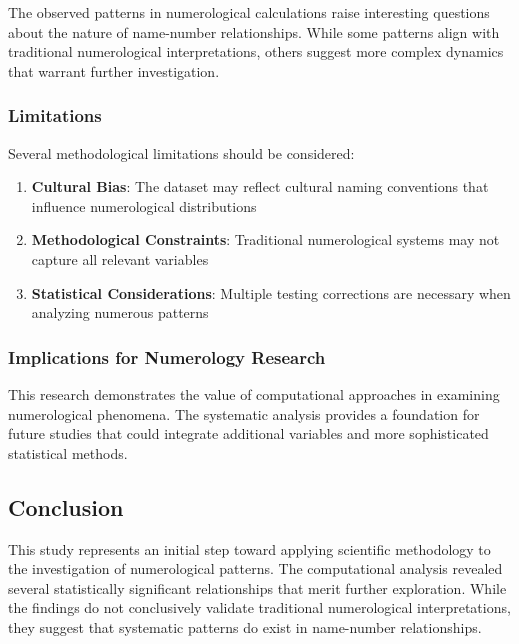 \documentclass[
  american,
  11pt,
  oneside]{article}
\providecommand{\tightlist}{%
  \setlength{\itemsep}{0pt}\setlength{\parskip}{0pt}}
\begin{document}
The observed patterns in numerological calculations raise interesting
questions about the nature of name-number relationships. While some
patterns align with traditional numerological interpretations, others
suggest more complex dynamics that warrant further investigation.

\subsubsection{Limitations}\label{limitations}

Several methodological limitations should be considered:

\begin{enumerate}
\def\labelenumi{\arabic{enumi}.}
\tightlist
\item
  \textbf{Cultural Bias}: The dataset may reflect cultural naming
  conventions that influence numerological distributions
\item
  \textbf{Methodological Constraints}: Traditional numerological systems
  may not capture all relevant variables
\item
  \textbf{Statistical Considerations}: Multiple testing corrections are
  necessary when analyzing numerous patterns
\end{enumerate}

\subsubsection{Implications for Numerology
Research}\label{implications-for-numerology-research}

This research demonstrates the value of computational approaches in
examining numerological phenomena. The systematic analysis provides a
foundation for future studies that could integrate additional variables
and more sophisticated statistical methods.

\subsection{Conclusion}\label{conclusion}

This study represents an initial step toward applying scientific
methodology to the investigation of numerological patterns. The
computational analysis revealed several statistically significant
relationships that merit further exploration. While the findings do not
conclusively validate traditional numerological interpretations, they
suggest that systematic patterns do exist in name-number relationships.
\end{document}
